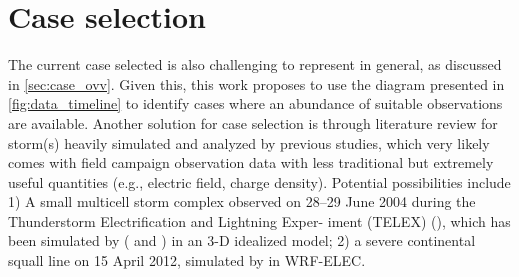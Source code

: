 \section{Case selection}
The current case selected is also challenging to represent in general, as discussed in \ref{sec:case_ovv}. Given this, this work proposes to use the diagram presented in \ref{fig:data_timeline} to identify cases where an abundance of suitable observations are available. Another solution for case selection is through literature review for storm(s) heavily simulated and analyzed by previous studies, which very likely comes with field campaign observation data with less traditional but extremely useful quantities (e.g., electric field, charge density). Potential possibilities include 1) A small multicell storm complex observed on 28–29 June 2004 during the Thunderstorm Electrification and Lightning Exper- iment (TELEX) (\cite{macgorman2008telex}), which has been simulated by (\cite{mansell2010simulated} and \cite{mansell2013aerosol}) in an 3-D idealized model; 2) a severe continental squall line on 15 April 2012, simulated by \cite{fierro2013implementation} in WRF-ELEC. 

